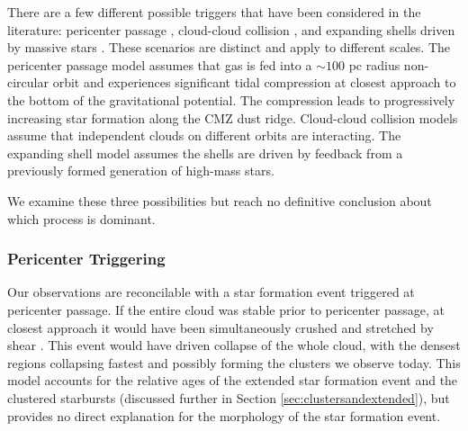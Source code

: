 \documentclass[twocolumn]{aastex61}
\begin{document}
There are a few different possible triggers that have been considered in the
literature: pericenter passage \citep[\S\ref{sec:pericenter};][]{Longmore2013a,Kruijssen2015a},
cloud-cloud collision
\citep[\S\ref{sec:ccc};][]{Hasegawa1994a,Mehringer1997a,Sato2000a}, and
expanding shells driven by
massive stars \citep[\S \ref{sec:expandingshells};][]{Martin-Pintado1999a}.
These scenarios are distinct and
apply to different scales.  The pericenter passage model assumes that gas is
fed into a $\sim100$ pc radius non-circular orbit and experiences significant
tidal compression at closest approach to the bottom of the gravitational
potential.  The compression leads to progressively increasing star formation
along the CMZ dust ridge.  Cloud-cloud collision models assume that independent
clouds on different orbits are interacting.  The expanding shell model assumes
the shells are driven by feedback from a previously formed generation of
high-mass stars.

We examine these three possibilities but reach no definitive conclusion about
which process is dominant.

\subsubsection{Pericenter Triggering}
\label{sec:pericenter}
Our observations are reconcilable with a star formation event triggered
at pericenter passage.  If the entire cloud was stable prior to pericenter
passage, at closest approach it would have been simultaneously crushed and
stretched by shear \citep{Kruijssen2015a}.  This event would have driven
collapse of the whole cloud, with the densest regions collapsing fastest and
possibly forming the clusters we observe today.  This model accounts for the
relative ages of the extended star formation event and the clustered starbursts
(discussed further in Section \ref{sec:clustersandextended}), but provides no
direct explanation for the morphology of the star formation event.
\end{document}
